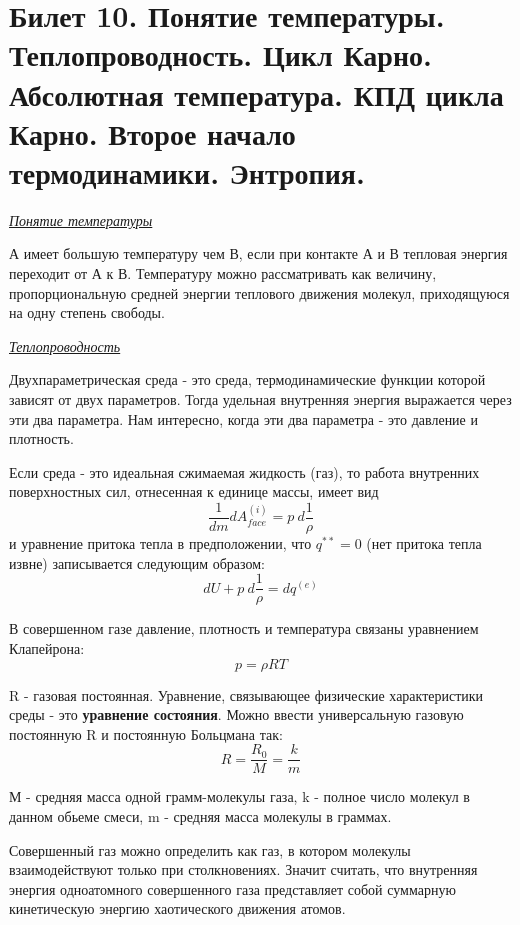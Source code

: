 \newpage
\section{Билет 10. Понятие температуры. Теплопроводность. Цикл Карно. Абсолютная температура. КПД цикла Карно. Второе начало термодинамики. Энтропия.}



\begin{center}
	\textit{\underline{Понятие температуры}}
\end{center}

А имеет большую температуру чем В,  если при контакте А и В тепловая энергия переходит от А к В. 
Температуру можно рассматривать как величину, пропорциональную средней энергии теплового движения молекул, приходящуюся на одну степень свободы.


\begin{center}
	\textit{\underline{Теплопроводность}}
\end{center}

Двухпараметрическая среда - это среда,  термодинамические функции которой зависят от двух параметров. Тогда удельная внутренняя энергия выражается через эти два параметра. Нам интересно, когда эти два параметра - это давление и плотность.

Если среда - это идеальная сжимаемая жидкость (газ), то работа внутренних поверхностных сил, отнесенная к единице массы, имеет вид
$$ \frac{1}{dm}dA_{face}^{(i)} = p\ d\frac{1}{\rho} $$
и уравнение притока тепла в предположении, что $q^{**} = 0$ (нет притока тепла извне) записывается следующим образом:
$$ dU + p\ d\frac{1}{\rho} = dq^{(e)} $$

В совершенном газе давление, плотность и температура связаны уравнением Клапейрона:
$$ p = \rho R T $$

R - газовая постоянная. Уравнение, связывающее физические характеристики среды - это \textbf{уравнение состояния}. Можно ввести универсальную газовую постоянную R и постоянную Больцмана так:
$$ R = \frac{R_0}{M} = \frac{k}{m} $$

М - средняя масса одной грамм-молекулы газа, k - полное число молекул в данном обьеме смеси,  m - средняя масса молекулы в граммах.

Совершенный газ можно определить как газ, в котором молекулы взаимодействуют только при столкновениях. Значит считать, что внутренняя энергия одноатомного совершенного газа представляет собой суммарную кинетическую энергию хаотического движения атомов. 

